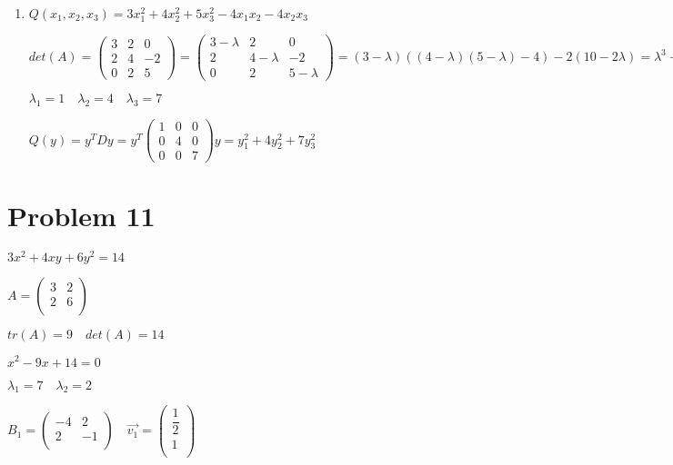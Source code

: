 \documentclass[12pt,letterpaper]{article}
\begin{document}
\begin{enumerate}[label=(\alph*)]
        $y = P^{-1}x = P^Tx$
        
        $y^TDy = y_1^2 + 3y_2^2$
        \item
        $Q(x_1, x_2, x_3) = 3x_1^2 + 4x_2^2 + 5x_3^2 - 4x_1x_2 - 4x_2x_3$
        
        $det(A) = \begin{pmatrix}
            3 & 2 & 0 \\
            2 & 4 & -2 \\
            0 & 2 & 5
        \end{pmatrix} = \begin{pmatrix}
            3 - \lambda & 2 & 0 \\
            2 & 4 - \lambda & -2 \\
            0 & 2 & 5 - \lambda
        \end{pmatrix} = (3 - \lambda)((4 - \lambda)(5 - \lambda) - 4) - 2(10 - 2\lambda) = \lambda^3 - 12\lambda^2 + 39\lambda + 28 = 0$
        
        $\lambda_1 = 1\quad \lambda_2 = 4\quad \lambda_3 = 7$
        
        $Q(y) = y^TDy = y^T\begin{pmatrix}
            1 & 0 & 0 \\
            0 & 4 & 0 \\
            0 & 0 & 7
        \end{pmatrix}y = y_1^2 + 4y_2^2 + 7y_3^2$
    \end{enumerate}
    
\section*{Problem 11}
    $3x^2 + 4xy + 6y^2 = 14$
    
    $A = \begin{pmatrix}
            3 & 2 \\
            2 & 6 \\
    \end{pmatrix}$
        
    $tr(A) = 9\quad det(A) = 14$
        
    $x^2 - 9x + 14 = 0$
    
    $\lambda_1 = 7\quad\lambda_2 = 2$
    
    $B_1 = \begin{pmatrix}
            -4 & 2 \\
            2 & -1 \\
        \end{pmatrix}\quad \vec{v_1} = \begin{pmatrix}
            \dfrac{1}{2} \\
            1 \\
        \end{pmatrix}$
        
\end{document}
